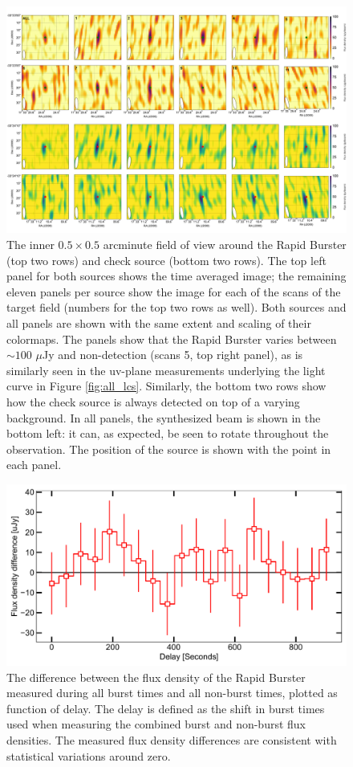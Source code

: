 \documentclass[fleqn,usenatbib]{mnras}
\begin{document}
\begin{figure}
\includegraphics[width=1.05\textwidth]{combined_check_RB.pdf}
 \caption{The inner $0.5\times0.5$ arcminute field of view around the Rapid Burster (top two rows) and check source (bottom two rows). The top left panel for both sources shows the time averaged image; the remaining eleven panels per source show the image for each of the scans of the target field (numbers for the top two rows as well). Both sources and all panels are shown with the same extent and scaling of their colormaps. The panels show that the Rapid Burster varies between $\sim 100$ $\mu$Jy and non-detection (scans 5, top right panel), as is similarly seen in the uv-plane measurements underlying the light curve in Figure \ref{fig:all_lcs}. Similarly, the bottom two rows show how the check source is always detected on top of a varying background. In all panels, the synthesized beam is shown in the bottom left: it can, as expected, be seen to rotate throughout the observation. The position of the source is shown with the point in each panel.}
 \label{fig:all_images}
\end{figure}

\begin{figure}
\includegraphics[width=\columnwidth]{delays.pdf}
 \caption{The difference between the flux density of the Rapid Burster measured during all burst times and all non-burst times, plotted as function of delay. The delay is defined as the shift in burst times used when measuring the combined burst and non-burst flux densities. The measured flux density differences are consistent with statistical variations around zero.}
 \label{fig:delay}
\end{figure}
\end{document}
